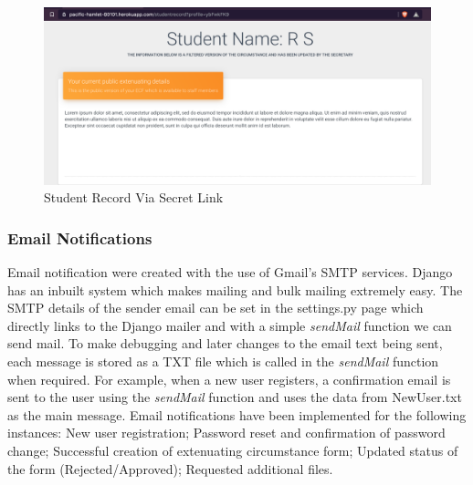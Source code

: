 \documentclass[../main.tex]{subfiles}
\begin{document}
\begin{figure}[H]
        \includegraphics[scale=0.7]
        {images/studrecord.png}
        \caption{\label{fig:studrecord} Student Record Via Secret Link}
      \end{figure}

\subsubsection{Email Notifications} 
Email notification were created with the use of Gmail's SMTP services. Django has an inbuilt system which makes mailing and bulk mailing extremely easy. The SMTP details of the sender email can be set in the settings.py page which directly links to the Django mailer and with a simple \textit{sendMail} function we can send mail. To make debugging and later changes to the email text being sent, each message is stored as a TXT file which is called in the \textit{sendMail} function when required. For example, when a new user registers, a confirmation email is sent to the user using the \textit{sendMail} function and uses the data from NewUser.txt as the main message. Email notifications have been implemented for the following instances: New user registration; Password reset and confirmation of password change; Successful creation of extenuating circumstance form; Updated status of the form (Rejected/Approved); Requested additional files.
\end{document}

